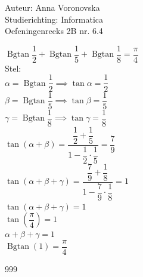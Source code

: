 \documentclass[a4paper]{article}
\begin{document}
  
\noindent \large Auteur: Anna Voronovska \\
\noindent \large Studierichting: Informatica\\
\noindent \large Oefeningenreeks 2B nr. 6.4\\

\medskip

\normalsize


$\operatorname{Bgtan} \dfrac{1}{2} + \operatorname{Bgtan} \dfrac{1}{5} + \operatorname{Bgtan} \dfrac{1}{8} = \dfrac{\pi}{4}$\\

Stel:\\ 

$\alpha = \operatorname{Bgtan} \dfrac{1}{2} \implies \tan \alpha = \dfrac{1}{2}$\\

$\beta = \operatorname{Bgtan} \dfrac{1}{5} \implies \tan \beta = \dfrac{1}{5}$\\

$\gamma = \operatorname{Bgtan} \dfrac{1}{8} \implies \tan \gamma = \dfrac{1}{8}$\\

$\tan(\alpha + \beta) = \dfrac{\dfrac{1}{2} + \dfrac{1}{5}}{1 - \dfrac{1}{2} \cdot \dfrac{1}{5}} = \dfrac{7}{9}$\\

$\tan(\alpha + \beta + \gamma) = \dfrac{\dfrac{7}{9} + \dfrac{1}{8}}{1 - \dfrac{7}{9} \cdot \dfrac{1}{8}} = 1$\\

$\tan(\alpha + \beta + \gamma) = 1$\\

$\tan\left(\dfrac{\pi}{4}\right) = 1$\\

$\alpha + \beta + \gamma = 1$\\

$\operatorname{Bgtan}(1) = \dfrac{\pi}{4}$\\


\begin{thebibliography}{999}
\end{thebibliography}
\end{document}
